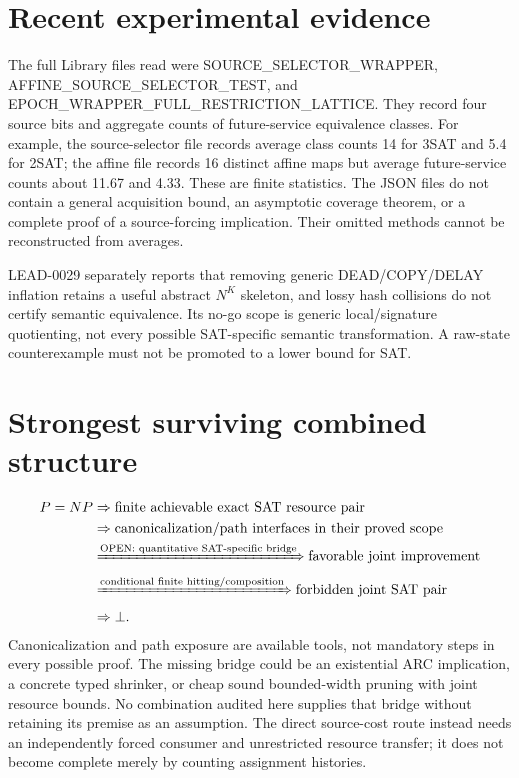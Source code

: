 \documentclass[11pt]{article}
\begin{document}
\section{Recent experimental evidence}
The full Library files read were SOURCE\_SELECTOR\_WRAPPER, AFFINE\_SOURCE\_SELECTOR\_TEST, and EPOCH\_WRAPPER\_FULL\_RESTRICTION\_LATTICE. They record four source bits and aggregate counts of future-service equivalence classes. For example, the source-selector file records average class counts 14 for 3SAT and 5.4 for 2SAT; the affine file records 16 distinct affine maps but average future-service counts about 11.67 and 4.33. These are finite statistics. The JSON files do not contain a general acquisition bound, an asymptotic coverage theorem, or a complete proof of a source-forcing implication. Their omitted methods cannot be reconstructed from averages.

LEAD-0029 separately reports that removing generic DEAD/COPY/DELAY inflation retains a useful abstract $N^K$ skeleton, and lossy hash collisions do not certify semantic equivalence. Its no-go scope is generic local/signature quotienting, not every possible SAT-specific semantic transformation. A raw-state counterexample must not be promoted to a lower bound for SAT.

\section{Strongest surviving combined structure}
\[
\begin{aligned}
P=NP&\Rightarrow\text{finite achievable exact SAT resource pair}\\
&\Rightarrow\text{canonicalization/path interfaces in their proved scope}\\
&\xRightarrow{\text{OPEN: quantitative SAT-specific bridge}}
\text{favorable joint improvement}\\
&\xRightarrow{\text{conditional finite hitting/composition}}
\text{forbidden joint SAT pair}\\
&\Rightarrow\bot.
\end{aligned}
\]
Canonicalization and path exposure are available tools, not mandatory steps in every possible proof. The missing bridge could be an existential ARC implication, a concrete typed shrinker, or cheap sound bounded-width pruning with joint resource bounds. No combination audited here supplies that bridge without retaining its premise as an assumption. The direct source-cost route instead needs an independently forced consumer and unrestricted resource transfer; it does not become complete merely by counting assignment histories.
\end{document}

